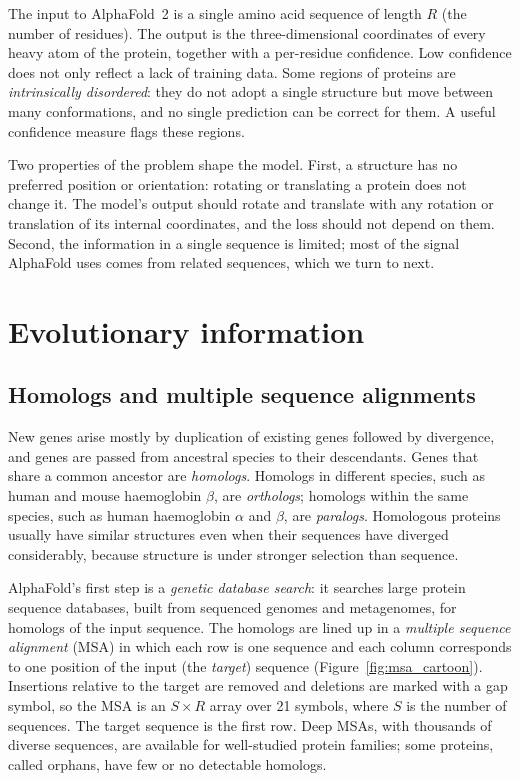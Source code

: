 The input to AlphaFold~2 is a single amino acid sequence of length $R$ (the number of residues). The output is the three-dimensional coordinates of every heavy atom of the protein, together with a per-residue confidence. Low confidence does not only reflect a lack of training data. Some regions of proteins are \emph{intrinsically disordered}: they do not adopt a single structure but move between many conformations, and no single prediction can be correct for them. A useful confidence measure flags these regions.

Two properties of the problem shape the model. First, a structure has no preferred position or orientation: rotating or translating a protein does not change it. The model's output should rotate and translate with any rotation or translation of its internal coordinates, and the loss should not depend on them. Second, the information in a single sequence is limited; most of the signal AlphaFold uses comes from related sequences, which we turn to next.

\section{Evolutionary information}
\label{sec:evolution}

\subsection{Homologs and multiple sequence alignments}

New genes arise mostly by duplication of existing genes followed by divergence, and genes are passed from ancestral species to their descendants. Genes that share a common ancestor are \emph{homologs}. Homologs in different species, such as human and mouse haemoglobin $\beta$, are \emph{orthologs}; homologs within the same species, such as human haemoglobin $\alpha$ and $\beta$, are \emph{paralogs}. Homologous proteins usually have similar structures even when their sequences have diverged considerably, because structure is under stronger selection than sequence.

AlphaFold's first step is a \emph{genetic database search}: it searches large protein sequence databases, built from sequenced genomes and metagenomes, for homologs of the input sequence. The homologs are lined up in a \emph{multiple sequence alignment} (MSA) in which each row is one sequence and each column corresponds to one position of the input (the \emph{target}) sequence (Figure~\ref{fig:msa_cartoon}). Insertions relative to the target are removed and deletions are marked with a gap symbol, so the MSA is an $S\times R$ array over 21 symbols, where $S$ is the number of sequences. The target sequence is the first row. Deep MSAs, with thousands of diverse sequences, are available for well-studied protein families; some proteins, called orphans, have few or no detectable homologs.

